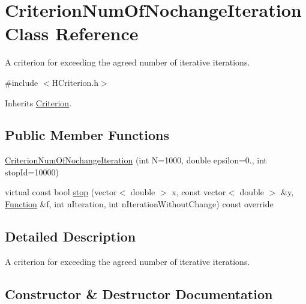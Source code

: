 \hypertarget{class_criterion_num_of_nochange_iteration}{}\section{Criterion\+Num\+Of\+Nochange\+Iteration Class Reference}
\label{class_criterion_num_of_nochange_iteration}


A criterion for exceeding the agreed number of iterative iterations.  




{\ttfamily \#include $<$H\+Criterion.\+h$>$}



Inherits \hyperlink{class_criterion}{Criterion}.

\subsection*{Public Member Functions}
\begin{DoxyCompactItemize}
\item 
\hyperlink{class_criterion_num_of_nochange_iteration_ab204084a592c313146aa78e696fefbdb}{Criterion\+Num\+Of\+Nochange\+Iteration} (int N=1000, double epsilon=0., int stop\+Id=10000)
\item 
virtual const bool \hyperlink{class_criterion_num_of_nochange_iteration_a4d46c7bfa8d1e31171d11c77a96e91ed}{stop} (vector$<$ double $>$ x, const vector$<$ double $>$ \&y, \hyperlink{class_function}{Function} \&f, int n\+Iteration, int n\+Iteration\+Without\+Change) const override
\end{DoxyCompactItemize}


\subsection{Detailed Description}
A criterion for exceeding the agreed number of iterative iterations. 

\subsection{Constructor \& Destructor Documentation}
\mbox{\label{class_criterion_num_of_nochange_iteration_ab204084a592c313146aa78e696fefbdb}} 
